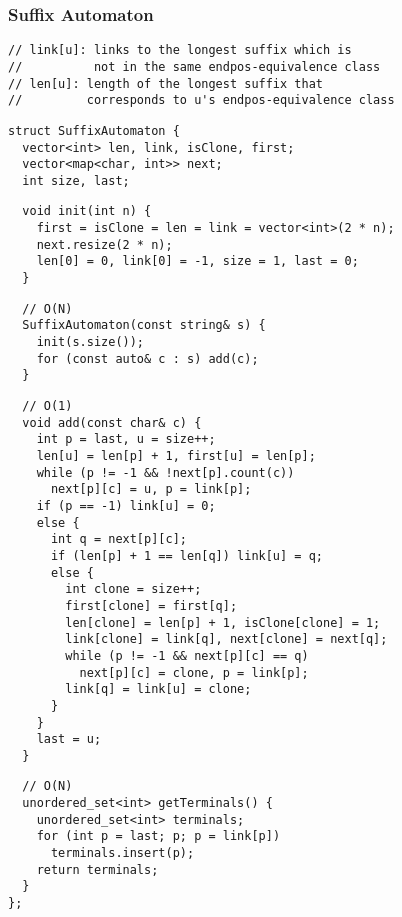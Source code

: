 \documentclass[twoside]{article}
\begin{document}
\begin{multicols*}{2}
\subsubsection*{Suffix Automaton}
\begin{verbatim}
// link[u]: links to the longest suffix which is
//          not in the same endpos-equivalence class
// len[u]: length of the longest suffix that
//         corresponds to u's endpos-equivalence class
\end{verbatim}
\vspace{-12pt}
\begin{verbatim}
struct SuffixAutomaton {
  vector<int> len, link, isClone, first;
  vector<map<char, int>> next;
  int size, last;
\end{verbatim}
\vspace{-12pt}
\begin{verbatim}
  void init(int n) {
    first = isClone = len = link = vector<int>(2 * n);
    next.resize(2 * n);
    len[0] = 0, link[0] = -1, size = 1, last = 0;
  }
\end{verbatim}
\vspace{-12pt}
\begin{verbatim}
  // O(N)
  SuffixAutomaton(const string& s) {
    init(s.size());
    for (const auto& c : s) add(c);
  }
\end{verbatim}
\vspace{-12pt}
\begin{verbatim}
  // O(1)
  void add(const char& c) {
    int p = last, u = size++;
    len[u] = len[p] + 1, first[u] = len[p];
    while (p != -1 && !next[p].count(c))
      next[p][c] = u, p = link[p];
    if (p == -1) link[u] = 0;
    else {
      int q = next[p][c];
      if (len[p] + 1 == len[q]) link[u] = q;
      else {
        int clone = size++;
        first[clone] = first[q];
        len[clone] = len[p] + 1, isClone[clone] = 1;
        link[clone] = link[q], next[clone] = next[q];
        while (p != -1 && next[p][c] == q)
          next[p][c] = clone, p = link[p];
        link[q] = link[u] = clone;
      }
    }
    last = u;
  }
\end{verbatim}
\vspace{-12pt}
\begin{verbatim}
  // O(N)
  unordered_set<int> getTerminals() {
    unordered_set<int> terminals;
    for (int p = last; p; p = link[p])
      terminals.insert(p);
    return terminals;
  }
};
\end{verbatim}


\end{multicols*}
\end{document}
